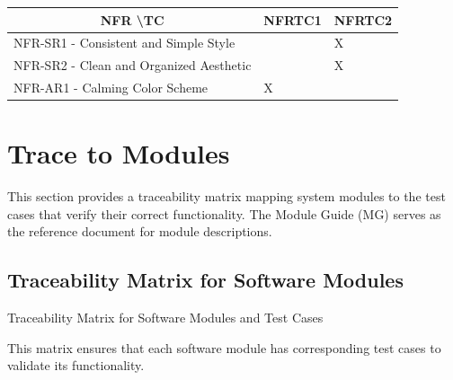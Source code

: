 \documentclass[12pt, titlepage]{article}
\begin{document}
\begin{table}[h!]
        \centering
        \end{table}


\begin{table}[h!]
    \centering
\begin{tabular}{|l|l|l|}
\hline
\multicolumn{1}{|c|}{NFR \textbackslash TC} & \multicolumn{1}{c|}{NFRTC1} & \multicolumn{1}{c|}{NFRTC2} \\ \hline
NFR-SR1 - Consistent and Simple Style & & X    \\ \hline
NFR-SR2 - Clean and Organized Aesthetic & & X    \\ \hline
NFR-AR1 - Calming Color Scheme & X & \\ \hline


\end{tabular}%
\end{table}

\pagebreak

\section{Trace to Modules}		
This section provides a traceability matrix mapping system modules to the test cases that verify their correct functionality. The Module Guide (MG) serves as the reference document for module descriptions.

\subsection{Traceability Matrix for Software Modules}
Traceability Matrix for Software Modules and Test Cases

This matrix ensures that each software module has corresponding test cases to validate its functionality.
\end{document}
